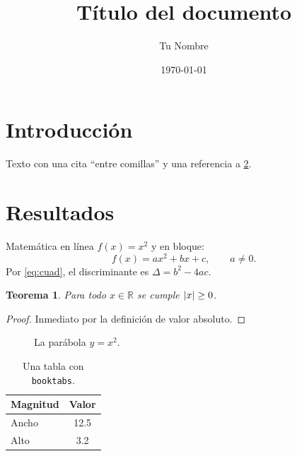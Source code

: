 \documentclass[11pt,a4paper]{article}
\title{Título del documento}
\author{Tu Nombre}
\date{\today}
\newcommand{\R}{\mathbb{R}}  \newcommand{\N}{\mathbb{N}}
\DeclarePairedDelimiter{\abs}{\lvert}{\rvert}   %
\theoremstyle{plain}      \newtheorem{teo}{Teorema}[section]
\theoremstyle{definition} \newtheorem{defi}[teo]{Definición}
\begin{document}
\maketitle

\section{Introducción}
Texto con una cita \enquote{entre comillas} y una referencia a
\cref{sec:resultados}.

\section{Resultados}\label{sec:resultados}
Matemática en línea $f(x)=x^2$ y en bloque:
\begin{equation}\label{eq:cuad}
  f(x) = ax^2 + bx + c, \qquad a \neq 0 .
\end{equation}
Por \cref{eq:cuad}, el discriminante es $\Delta = b^2 - 4ac$.

\begin{teo}\label{teo:ej}
  Para todo $x \in \R$ se cumple $\abs{x} \ge 0$.
\end{teo}
\begin{proof}
  Inmediato por la definición de valor absoluto.
\end{proof}

\begin{figure}[H]
  \centering
  \caption{La parábola $y=x^2$.}\label{fig:par}
\end{figure}

\begin{table}[H]
  \centering
  \begin{tabular}{@{}lS@{}}
    \toprule
    Magnitud & {Valor} \\
    \midrule
    Ancho  & 12.5 \\
    Alto   &  3.2 \\
    \bottomrule
  \end{tabular}
  \caption{Una tabla con \texttt{booktabs}.}\label{tab:ej}
\end{table}

\end{document}

